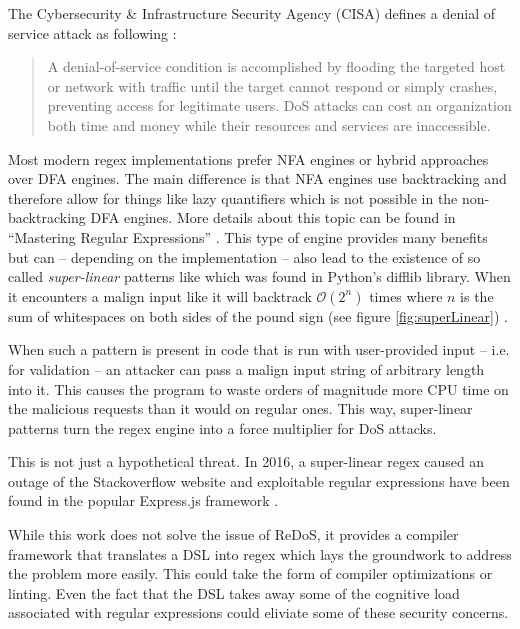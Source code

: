 The Cybersecurity \& Infrastructure Security Agency (CISA) defines a denial of service attack as following \cite{DenialOfService}:

{\small
\begin{quote}
A denial-of-service condition is accomplished by flooding the targeted host or network with traffic until the target cannot respond or simply crashes, preventing access for legitimate users. DoS attacks can cost an organization both time and money while their resources and services are inaccessible.
\end{quote}
}

Most modern regex implementations prefer NFA engines or hybrid approaches over DFA engines. The main difference is that NFA engines use backtracking and therefore allow for things like lazy quantifiers which is not possible in the non-backtracking DFA engines. More details about this topic can be found in \enquote{Mastering Regular Expressions} \cite{MasteringRegex}. This type of engine provides many benefits but can -- depending on the implementation -- also lead to the existence of so called \emph{super-linear} patterns like  which was found in Python's difflib library. When it encounters a malign input like  it will backtrack $\mathcal{O}(2^n)$ times where $n$ is the sum of whitespaces on both sides of the pound sign (see figure \ref{fig:superLinear}) \cite{RedosInPractice}.

When such a pattern is present in code that is run with user-provided input -- i.e. for validation -- an attacker can pass a malign input string of arbitrary length into it. This causes the program to waste orders of magnitude more CPU time on the malicious requests than it would on regular ones. This way, super-linear patterns turn the regex engine into a force multiplier for DoS attacks.

This is not just a hypothetical threat. In 2016, a super-linear regex caused an outage of the Stackoverflow website \cite{RedosStackOverflowOutage} and exploitable regular expressions have been found in the popular Express.js framework \cite{RedosExpressJs}.

While this work does not solve the issue of ReDoS, it provides a compiler framework that translates a DSL into regex which lays the groundwork to address the problem more easily. This could take the form of compiler optimizations or linting. Even the fact that the DSL takes away some of the cognitive load associated with regular expressions could eliviate some of these security concerns.

